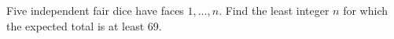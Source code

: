 Five independent fair dice have faces $1,\ldots,n$. Find the least integer $n$ for which the expected total is at least 69.
